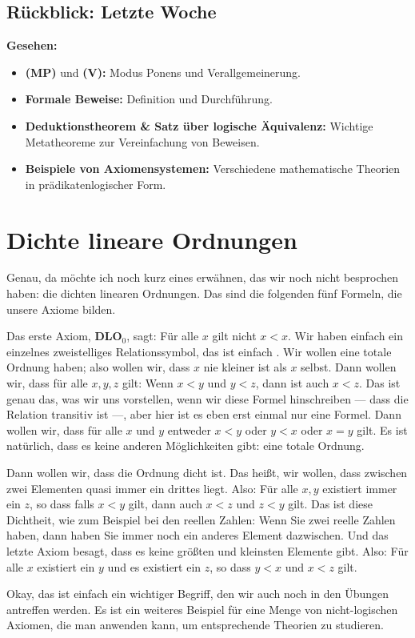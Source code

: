 \subsection{Rückblick: Letzte Woche}
\begin{math-stroke}
\textbf{Gesehen:}
\begin{itemize}
    \item \textbf{(MP)} und \textbf{(V):} Modus Ponens und Verallgemeinerung.
    \item \textbf{Formale Beweise:} Definition und Durchführung.
    \item \textbf{Deduktionstheorem \& Satz über logische Äquivalenz:} Wichtige Metatheoreme zur Vereinfachung von Beweisen.
    \item \textbf{Beispiele von Axiomensystemen:} Verschiedene mathematische Theorien in prädikatenlogischer Form.
\end{itemize}
\end{math-stroke}

\section{Dichte lineare Ordnungen}

\begin{spoken-clean}[00:02:15 - 00:04:20]
Genau, da möchte ich noch kurz eines erwähnen, das wir noch nicht besprochen haben: die dichten linearen Ordnungen. Das sind die folgenden fünf Formeln, die unsere Axiome bilden.

Das erste Axiom, \textbf{DLO$_0$}, sagt: Für alle $x$ gilt nicht $x < x$. Wir haben einfach ein einzelnes zweistelliges Relationssymbol, das ist einfach . Wir wollen eine totale Ordnung haben; also wollen wir, dass $x$ nie kleiner ist als $x$ selbst. Dann wollen wir, dass für alle $x, y, z$ gilt: Wenn $x < y$ und $y < z$, dann ist auch $x < z$. Das ist genau das, was wir uns vorstellen, wenn wir diese Formel hinschreiben --- dass die Relation transitiv ist ---, aber hier ist es eben erst einmal nur eine Formel. Dann wollen wir, dass für alle $x$ und $y$ entweder $x < y$ oder $y < x$ oder $x = y$ gilt. Es ist natürlich, dass es keine anderen Möglichkeiten gibt: eine totale Ordnung.

Dann wollen wir, dass die Ordnung dicht ist. Das heißt, wir wollen, dass zwischen zwei Elementen quasi immer ein drittes liegt. Also: Für alle $x, y$ existiert immer ein $z$, so dass falls $x < y$ gilt, dann auch $x < z$ und $z < y$ gilt. Das ist diese Dichtheit, wie zum Beispiel bei den reellen Zahlen: Wenn Sie zwei reelle Zahlen haben, dann haben Sie immer noch ein anderes Element dazwischen. Und das letzte Axiom besagt, dass es keine größten und kleinsten Elemente gibt. Also: Für alle $x$ existiert ein $y$ und es existiert ein $z$, so dass $y < x$ und $x < z$ gilt.

Okay, das ist einfach ein wichtiger Begriff, den wir auch noch in den Übungen antreffen werden. Es ist ein weiteres Beispiel für eine Menge von nicht-logischen Axiomen, die man anwenden kann, um entsprechende Theorien zu studieren.
\end{spoken-clean}

